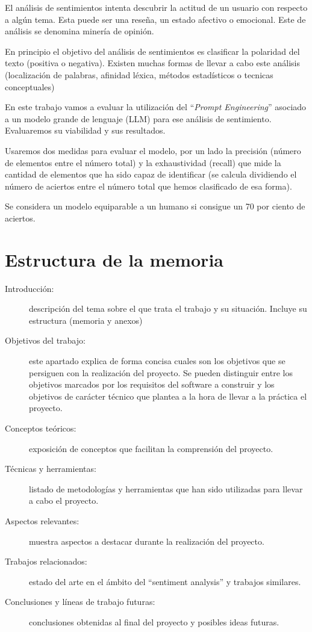 
El análisis de sentimientos intenta descubrir la actitud de un usuario 
con respecto a algún tema.
Esta puede ser una reseña, un estado afectivo o emocional. 
Este de análisis se denomina minería de opinión.

En principio el objetivo del análisis de sentimientos es 
clasificar la polaridad del texto (positiva o negativa).
Existen muchas formas de llevar a cabo este análisis (localización de palabras, 
afinidad léxica, métodos estadísticos o tecnicas conceptuales)~\cite{Bannister2015}

En este trabajo vamos a evaluar la utilización del ``\emph{Prompt Engineering}'' 
asociado a un modelo grande de lenguaje (LLM) para ese análisis de sentimiento.
Evaluaremos su viabilidad y sus resultados. 

Usaremos dos medidas para evaluar el modelo, 
por un lado la precisión (número de elementos entre el número total) 
y la exhaustividad (recall) que mide la cantidad de elementos 
que ha sido capaz de identificar 
(se calcula dividiendo el número de aciertos entre el número 
total que hemos clasificado de esa forma). 

Se considera un modelo equiparable a un humano si consigue un 70 por ciento de aciertos.~\cite{Saif2013}

\section{Estructura de la memoria}
\begin{description}
	\item[Introducción:] descripción del tema sobre el que trata el trabajo y su situación. 
    Incluye su estructura (memoria y anexos)
	\item[Objetivos del trabajo:] este apartado explica de forma concisa cuales son los objetivos 
    que se persiguen con la realización del proyecto. 
    Se pueden distinguir entre los objetivos marcados por los requisitos del software a construir y
     los objetivos de carácter técnico que plantea a la hora de llevar a la práctica el proyecto.
    \item[Conceptos teóricos:] exposición de conceptos que facilitan la comprensión del proyecto.
    \item[Técnicas y herramientas:] listado de metodologías y herramientas que han sido 
    utilizadas para llevar a cabo el proyecto.
    \item[Aspectos relevantes:] muestra aspectos a destacar durante la realización del proyecto.
    \item[Trabajos relacionados:] estado del arte en el ámbito del ``sentiment analysis'' y trabajos similares.
    \item[Conclusiones y líneas de trabajo futuras:] conclusiones obtenidas al final del proyecto y posibles ideas futuras.
\end{description}
